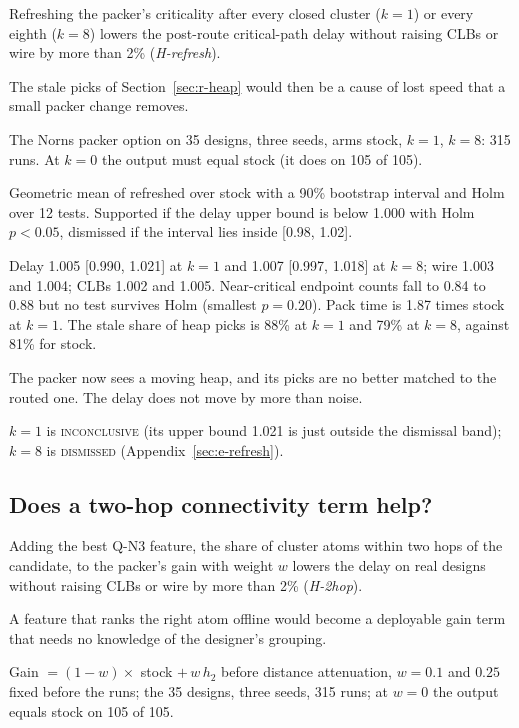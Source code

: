  Refreshing the packer's criticality after every closed cluster ($k=1$) or every eighth ($k=8$) lowers the post-route critical-path delay without raising CLBs or wire by more than 2\% (\emph{H-refresh}).

 The stale picks of Section~\ref{sec:r-heap} would then be a cause of lost speed that a small packer change removes.

 The Norns packer option  on 35 designs, three seeds, arms stock, $k=1$, $k=8$: 315 runs. At $k=0$ the output must equal stock (it does on 105 of 105).

 Geometric mean of refreshed over stock with a 90\% bootstrap interval and Holm over 12 tests. Supported if the delay upper bound is below 1.000 with Holm $p<0.05$, dismissed if the interval lies inside [0.98, 1.02].

 Delay 1.005 [0.990, 1.021] at $k=1$ and 1.007 [0.997, 1.018] at $k=8$; wire 1.003 and 1.004; CLBs 1.002 and 1.005. Near-critical endpoint counts fall to 0.84 to 0.88 but no test survives Holm (smallest $p=0.20$). Pack time is 1.87 times stock at $k=1$. The stale share of heap picks is 88\% at $k=1$ and 79\% at $k=8$, against 81\% for stock.

 The packer now sees a moving heap, and its picks are no better matched to the routed one. The delay does not move by more than noise.

 $k=1$ is \textsc{inconclusive} (its upper bound 1.021 is just outside the dismissal band); $k=8$ is \textsc{dismissed} (Appendix~\ref{sec:e-refresh}).

\subsection{Does a two-hop connectivity term help?}
\label{sec:r-2hop}

 Adding the best Q-N3 feature, the share of cluster atoms within two hops of the candidate, to the packer's gain with weight $w$ lowers the delay on real designs without raising CLBs or wire by more than 2\% (\emph{H-2hop}).

 A feature that ranks the right atom offline would become a deployable gain term that needs no knowledge of the designer's grouping.

 Gain $=(1-w)\times$ stock $+\,w\,h_2$ before distance attenuation, $w=0.1$ and $0.25$ fixed before the runs; the 35 designs, three seeds, 315 runs; at $w=0$ the output equals stock on 105 of 105.

